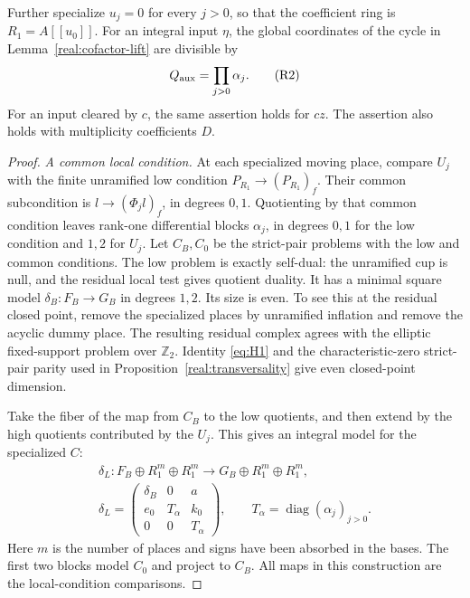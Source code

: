 \begin{proposition}\label{real:cofactor-divisibility}
Further specialize \(u_j=0\) for every \(j>0\), so that the
coefficient ring is \(R_1=A[[u_0]]\). For an integral input \(\eta\),
the global coordinates of the cycle in Lemma~\ref{real:cofactor-lift}
are divisible by
\[
 Q_{\rm aux}=\prod_{j>0}\alpha_j.\tag{R2}\label{eq:R2}
\]
For an input cleared by \(c\), the same assertion holds for \(cz\).
The assertion also holds with multiplicity coefficients \(D\).
\end{proposition}

\begin{proof}
\emph{A common local condition.}
At each specialized moving place, compare \(U_j\) with the finite
unramified low condition
\(P_{R_1}\to(P_{R_1})_f\). Their common subcondition is
\(l\to(\Phi_jl)_f\), in degrees \(0,1\). Quotienting by that common
condition leaves rank-one differential blocks \(\alpha_j\), in
degrees \(0,1\) for the low condition and \(1,2\) for \(U_j\).
Let \(C_B,C_0\) be the strict-pair problems with the low and common
conditions. The low problem is exactly self-dual: the unramified cup
is null, and the residual local test gives quotient duality. It has
a minimal square model \(\delta_B:F_B\to G_B\) in degrees \(1,2\).
Its size is even. To see this at the residual closed point, remove
the specialized places by unramified inflation and remove the
acyclic dummy place. The resulting residual complex agrees with the
elliptic fixed-support problem over \(\mathbb Z_2\). Identity
\eqref{eq:H1} and the characteristic-zero strict-pair parity used in
Proposition~\ref{real:transversality} give even closed-point dimension.

Take the fiber of the map from \(C_B\) to the low quotients, and then
extend by the high quotients contributed by the \(U_j\). This gives
an integral model for the specialized \(C\):
\begin{equation}\label{real:block-model}
 \begin{gathered}
 \delta_L:F_B\oplus R_1^m\oplus R_1^m
       \longrightarrow G_B\oplus R_1^m\oplus R_1^m,\\
 \delta_L=
 \begin{pmatrix}
  \delta_B&0&a\\
  e_0&T_\alpha&k_0\\
  0&0&T_\alpha
 \end{pmatrix},\qquad
 T_\alpha=\operatorname{diag}(\alpha_j)_{j>0}.
 \end{gathered}
\end{equation}
Here \(m\) is the number of places and signs have been absorbed in
the bases. The first two blocks model \(C_0\) and project to \(C_B\).
All maps in this construction are the local-condition comparisons.


\end{proof}
